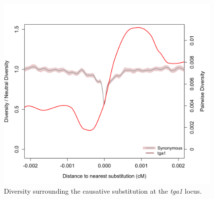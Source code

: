 \documentclass[12pt,a4paper]{article}
\begin{document}
\begin{figure}[h]
  \begin{center}
    \includegraphics[width=\textwidth]{FigsAndFiles/plotDiversity_TvM_Folded2_Significance_tga1Supp_June.png}
    \end{center}
\caption{Diversity surrounding the causative substitution at the \emph{tga1} locus.  \label{sFig:tga1}}
\end{figure}
\clearpage
\end{document}
